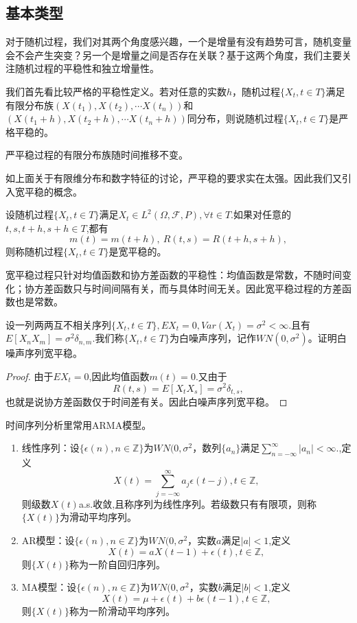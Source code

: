 \documentclass[lang=cn,10pt]{elegantbook}
\begin{document}
	\subsection{基本类型}
	对于随机过程，我们对其两个角度感兴趣，一个是增量有没有趋势可言，随机变量会不会产生突变？另一个是增量之间是否存在关联？基于这两个角度，我们主要关注随机过程的平稳性和独立增量性。
	\begin{definition}[严平稳]
		我们首先看比较严格的平稳性定义。若对任意的实数\(h\)，随机过程\(\{X_t,t\in T\}\)满足有限分布族\((X(t_1),X(t_2),\cdots X(t_n))\)和\((X(t_1+h),X(t_2+h),\cdots X(t_n+h))\)同分布，则说随机过程\(\{X_t,t\in T\}\)是严格平稳的。
	\end{definition}
    严平稳过程的有限分布族随时间推移不变。

	如上面关于有限维分布和数字特征的讨论，严平稳的要求实在太强。因此我们又引入宽平稳的概念。
	\begin{definition}[宽平稳]
		设随机过程\(\{X_t,t\in T\}\)满足\(X_t\in L^2(\Omega,\mathcal{F},P),\forall t\in T.\)如果对任意的\(t,s,t+h,s+h\in T\),都有
		\[m(t)=m(t+h),\ R(t,s)=R(t+h,s+h),\]
		则称随机过程\(\{X_t,t\in T\}\)是宽平稳的。
	\end{definition}
	\begin{note}
		宽平稳过程只针对均值函数和协方差函数的平稳性：均值函数是常数，不随时间变化；协方差函数只与时间间隔有关，而与具体时间无关。因此宽平稳过程的方差函数也是常数。
	\end{note}
	\begin{example}[白噪声序列]
		设一列两两互不相关序列\(\{X_t,t\in T\},EX_t=0, Var(X_t)=\sigma^2<\infty.\)且有\(E[X_nX_m]=\sigma^2\delta_{n,m}.\)我们称\(\{X_t,t\in T\}\)为白噪声序列，记作\(WN(0,\sigma^2)\)。证明白噪声序列宽平稳。
	\end{example}
	\begin{proof}
		由于\(EX_t=0\),因此均值函数\(m(t)=0.\)又由于
		\[R(t,s)=E[X_tX_s]=\sigma^2\delta_{t,s},\]
		也就是说协方差函数仅于时间差有关。因此白噪声序列宽平稳。
	\end{proof}
	时间序列分析里常用ARMA模型。
	\begin{example}[ARMA]
		\begin{enumerate}
			\item 线性序列：设\(\{\epsilon(n),n\in \mathbb{Z}\}\)为\(WN(0,\sigma^2\)，数列\(\{a_n\}\)满足\(\sum_{n=-\infty}^{\infty}|a_n|<\infty.\),定义
			\[X(t)=\sum_{j=-\infty}^{\infty}a_j\epsilon(t-j),t\in \mathbb{Z},\]
			则级数\(X(t)\)a.s.收敛,且称序列为线性序列。若级数只有有限项，则称\(\{X(t)\}\)为滑动平均序列。
			\item AR模型：设\(\{\epsilon(n),n\in \mathbb{Z}\}\)为\(WN(0,\sigma^2\)，实数\(a\)满足\(|a|<1\),定义
			\[X(t)=aX(t-1)+\epsilon(t),t\in \mathbb{Z},\]
			则\(\{X(t)\}\)称为一阶自回归序列。
			\item MA模型：设\(\{\epsilon(n),n\in \mathbb{Z}\}\)为\(WN(0,\sigma^2\)，实数\(b\)满足\(|b|<1\),定义
			\[X(t)=\mu+\epsilon(t)+b\epsilon(t-1),t\in \mathbb{Z},\]
			则\(\{X(t)\}\)称为一阶滑动平均序列。
		\end{enumerate}
	\end{example}
\end{document}
